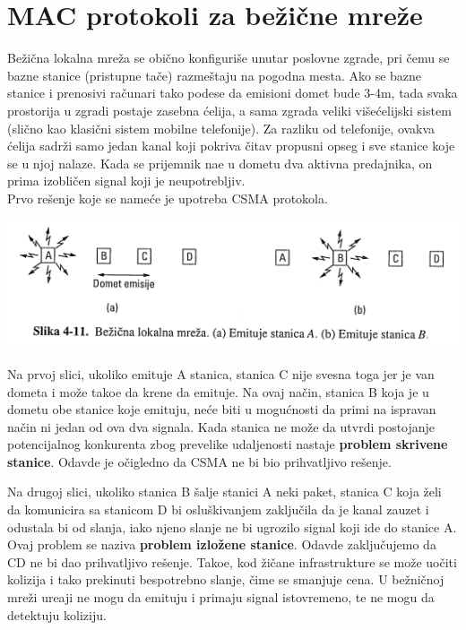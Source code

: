 \documentclass{article} %
\begin{document}
\section{MAC protokoli za bežične mreže}

Be\v{z}i\v{c}na lokalna mre\v{z}a se obi\v{c}no konfiguri\v{s}e unutar poslovne zgrade, pri \v{c}emu se bazne stanice (pristupne ta\v{c}e) razme\v{s}taju na pogodna mesta. Ako se bazne stanice i prenosivi ra\v{c}unari tako podese da emisioni domet bude 3-4m, tada svaka prostorija u zgradi postaje zasebna \'{c}elija, a sama zgrada veliki vi\v{s}e\'{c}elijski sistem (sli\v{c}no kao klasi\v{c}ni sistem mobilne telefonije). Za razliku od telefonije, ovakva \'{c}elija sadr\v{z}i samo jedan kanal koji pokriva \v{c}itav propusni opseg i sve stanice koje se u njoj nalaze. Kada se prijemnik na\dj{}e u dometu dva aktivna predajnika, on prima izobli\v{c}en signal koji je neupotrebljiv.\\
Prvo re\v{s}enje koje se name\'{c}e je upotreba CSMA protokola.

\begin{center}
\includegraphics[scale=0.5]{mac-bezicne}
\end{center}

Na prvoj slici, ukoliko emituje A stanica, stanica C nije svesna toga jer je van dometa i mo\v{z}e tako\dj{}e da krene da emituje. Na ovaj na\v{c}in, stanica B koja je u dometu obe stanice koje emituju, ne\'{c}e biti u mogu\'{c}nosti da primi na ispravan na\v{c}in ni jedan od ova dva signala. Kada stanica ne mo\v{z}e da utvrdi postojanje potencijalnog konkurenta zbog prevelike udaljenosti nastaje \textbf{problem skrivene stanice}. Odavde je o\v{c}igledno da CSMA ne bi bio prihvatljivo re\v{s}enje.

Na drugoj slici, ukoliko stanica B \v{s}alje stanici A neki paket, stanica C koja \v{z}eli da komunicira sa stanicom D bi oslu\v{s}kivanjem zaklju\v{c}ila da je kanal zauzet i odustala bi od slanja, iako njeno slanje ne bi ugrozilo signal koji ide do stanice A. Ovaj problem se naziva \textbf{problem izlo\v{z}ene stanice}. Odavde zaklju\v{c}ujemo da CD ne bi dao prihvatljivo re\v{s}enje. Tako\dj{}e, kod \v{z}i\v{c}ane infrastrukture se mo\v{z}e uo\v{c}iti kolizija i tako prekinuti bespotrebno slanje, \v{c}ime se smanjuje cena. U be\v{z}ni\v{c}noj mre\v{z}i ure\dj{}aji ne mogu da emituju i primaju signal istovremeno, te ne mogu da detektuju koliziju.
\end{document}
